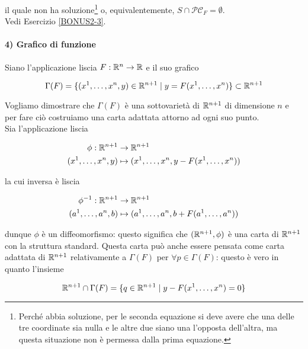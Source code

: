 il quale non ha soluzione\footnote{%
	Perché abbia soluzione, per le seconda equazione si deve avere che una delle tre coordinate sia nulla e le altre due siano una l'opposta dell'altra, ma questa situazione non è permessa dalla prima equazione.%
} o, equivalentemente, $ S \cap \mathcal{PC}_{F} = \emptyset $.\\
Vedi Esercizio \ref{BONUS2-3}.

\paragraph{4) Grafico di funzione}

Siano l'applicazione liscia $ F : \mathbb{R}^{n} \to \mathbb{R} $ e il suo grafico

\begin{equation}
	\Gamma(F) = \{ (x^{1},\dots,x^{n},y) \in \mathbb{R}^{n+1} \mid y = F(x^{1},\dots,x^{n}) \} \subset \mathbb{R}^{n+1}
\end{equation}

Vogliamo dimostrare che $ \Gamma(F) $ è una sottovarietà di $ \mathbb{R}^{n+1} $ di dimensione $ n $ e per fare ciò costruiamo una carta adattata attorno ad ogni suo punto.\\
Sia l'applicazione liscia

\begin{align}
	\begin{split}
		\phi : \mathbb{R}^{n+1} &\to \mathbb{R}^{n+1}\\
		(x^{1},\dots,x^{n},y) &\mapsto (x^{1},\dots,x^{n},y - F(x^{1},\dots,x^{n}))
	\end{split}
\end{align}

la cui inversa è liscia

\begin{align}
	\begin{split}
		\phi^{-1} : \mathbb{R}^{n+1} &\to \mathbb{R}^{n+1}\\
		(a^{1},\dots,a^{n},b) &\mapsto (a^{1},\dots,a^{n},b + F(a^{1},\dots,a^{n}))
	\end{split}
\end{align}

dunque $ \phi $ è un diffeomorfismo: questo significa che $ (\mathbb{R}^{n+1},\phi) $ è una carta di $ \mathbb{R}^{n+1} $ con la struttura standard. Questa carta può anche essere pensata come carta adattata di $ \mathbb{R}^{n+1} $ relativamente a $ \Gamma(F) $ per $ \forall p \in \Gamma(F) $: questo è vero in quanto l'insieme

\begin{equation}
	\mathbb{R}^{n+1} \cap \Gamma(F) = \{ q \in \mathbb{R}^{n+1} \mid y - F(x^{1},\dots,x^{n}) = 0 \}
\end{equation}

